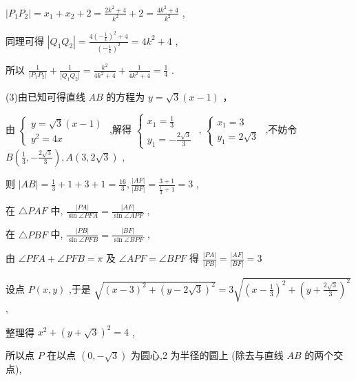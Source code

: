 \documentclass[10pt]{article}
\begin{document}
\(\left| {{P}_{1}{P}_{2}}\right|  = {x}_{1} + {x}_{2} + 2 = \frac{2{k}^{2} + 4}{{k}^{2}} + 2 = \frac{4{k}^{2} + 4}{{k}^{2}}\) ,

同理可得 \(\left| {{Q}_{1}{Q}_{2}}\right|  = \frac{4{\left( -\frac{1}{k}\right) }^{2} + 4}{{\left( -\frac{1}{k}\right) }^{2}} = 4{k}^{2} + 4\) ,

所以 \(\frac{1}{\left| {P}_{1}{P}_{2}\right| } + \frac{1}{\left| {Q}_{1}{Q}_{2}\right| } = \frac{{k}^{2}}{4{k}^{2} + 4} + \frac{1}{4{k}^{2} + 4} = \frac{1}{4}\) .

(3)由已知可得直线 \({AB}\) 的方程为 \(y = \sqrt{3}\left( {x - 1}\right)\) ，

由 \(\left\{  \begin{array}{l} y = \sqrt{3}\left( {x - 1}\right) \\  {y}^{2} = {4x} \end{array}\right.\) ,解得 \(\left\{  \begin{array}{l} {x}_{1} = \frac{1}{3} \\  {y}_{1} =  - \frac{2\sqrt{3}}{3} \end{array}\right.\) , \(\left\{  \begin{array}{l} {x}_{1} = 3 \\  {y}_{1} = 2\sqrt{3} \end{array}\right.\) ,不妨令 \(B\left( {\frac{1}{3}, - \frac{2\sqrt{3}}{3}}\right) ,A\left( {3,2\sqrt{3}}\right)\) ,

则 \(\left| {AB}\right|  = \frac{1}{3} + 1 + 3 + 1 = \frac{16}{3},\frac{\left| AF\right| }{\left| BF\right| } = \frac{3 + 1}{\frac{1}{3} + 1} = 3\) ,

在 \(\bigtriangleup {PAF}\) 中, \(\frac{\left| PA\right| }{\sin \angle {PFA}} = \frac{\left| AF\right| }{\sin \angle {APF}}\) ,

在 \(\bigtriangleup {PBF}\) 中, \(\frac{\left| PB\right| }{\sin \angle {PFB}} = \frac{\left| BF\right| }{\sin \angle {BPF}}\) ,

由 \(\angle {PFA} + \angle {PFB} = \pi\) 及 \(\angle {APF} = \angle {BPF}\) 得 \(\frac{\left| PA\right| }{\left| PB\right| } = \frac{\left| AF\right| }{\left| BF\right| } = 3\)

设点 \(P\left( {x,y}\right)\) ,于是 \(\sqrt{{\left( x - 3\right) }^{2} + {\left( y - 2\sqrt{3}\right) }^{2}} = 3\sqrt{{\left( x - \frac{1}{3}\right) }^{2} + {\left( y + \frac{2\sqrt{3}}{3}\right) }^{2}}\) ,

整理得 \({x}^{2} + {\left( y + \sqrt{3}\right) }^{2} = 4\) ,

所以点 \(P\) 在以点 \(\left( {0, - \sqrt{3}}\right)\) 为圆心,2 为半径的圆上 (除去与直线 \({AB}\) 的两个交点),
\end{document}
